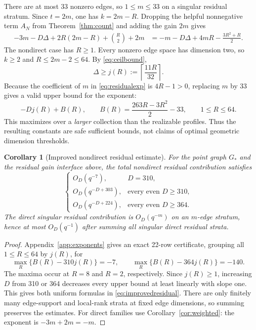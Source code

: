 \documentclass[11pt]{article}
\newtheorem{corollary}[theorem]{Corollary}
\theoremstyle{definition}
\theoremstyle{remark}
\newcommand{\1}{\mathbf 1}
\begin{document}
There are at most 33 nonzero edges, so $1\le m\le33$ on a singular residual
stratum. Since $t=2m$, one has $k=2m-R$. Dropping the helpful nonnegative term
$A_N$ from Theorem~\ref{thm:count} and adding the gain $2m$ gives
\begin{align}
 -3m-D\Delta+2R(2m-R)+\binom R2+2m
 &=-m-D\Delta+4mR-\frac{3R^2+R}{2}.
 \label{eq:residualexp}
\end{align}
The nondirect case has $R\ge1$. Every nonzero edge space has dimension two, so
$k\ge2$ and $R\le2m-2\le64$. By \eqref{eq:ceilbound},
\begin{equation}
 \Delta\ge j(R):=\left\lceil\frac{11R}{32}\right\rceil.
 \label{eq:j}
\end{equation}
Because the coefficient of $m$ in \eqref{eq:residualexp} is $4R-1>0$, replacing
$m$ by 33 gives a valid upper bound for the exponent:
\begin{equation}
 -Dj(R)+B(R),\qquad
 B(R)=\frac{263R-3R^2}{2}-33,
 \qquad 1\le R\le64.
 \label{eq:BR}
\end{equation}
This maximizes over a \emph{larger} collection than the realizable profiles.
Thus the resulting constants are safe sufficient bounds, not claims of
optimal geometric dimension thresholds.

\begin{corollary}[Improved nondirect residual estimate]
\label{cor:residual}
For the point graph $G_*$ and the residual gain interface above, the total
nondirect residual contribution satisfies
\begin{equation}
 \begin{cases}
 O_D(q^{-7}),&D=310,\\
 O_D(q^{-D+303}),&\text{every even }D\ge310,\\
 O_D(q^{-D+224}),&\text{every even }D\ge364.
 \end{cases}
 \label{eq:improvedresidual}
\end{equation}
The direct singular residual contribution is $O_D(q^{-m})$ on an $m$-edge
stratum, hence at most $O_D(q^{-1})$ after summing all singular direct residual
strata.
\end{corollary}

\begin{proof}
Appendix~\ref{app:exponents} gives an exact 22-row certificate, grouping all
$1\le R\le64$ by $j(R)$, for
\begin{equation}
 \max_R\{B(R)-310j(R)\}=-7,\qquad
 \max_R\{B(R)-364j(R)\}=-140.
 \label{eq:exponentmax}
\end{equation}
The maxima occur at $R=8$ and $R=2$, respectively. Since $j(R)\ge1$, increasing
$D$ from 310 or 364 decreases every upper bound at least linearly with slope
one. This gives both uniform formulas in \eqref{eq:improvedresidual}.
There are only finitely many edge-support and local-rank strata at fixed edge
dimensions, so summing preserves the estimates. For direct families use
Corollary~\ref{cor:weighted}: the exponent is $-3m+2m=-m$.
\end{proof}
\end{document}
